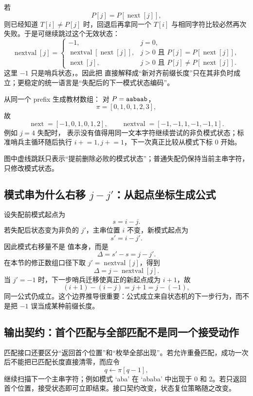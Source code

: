 \documentclass[UTF8,fontset=none,11pt,a4paper]{ctexart}
\begin{document}
若
\[
P[j]=P[\operatorname{next}[j]],
\]
则已经知道 $T[i]\ne P[j]$ 时，回退后再拿同一个 $T[i]$ 与相同字符比较必然再次失败。于是可继续跳过这个无效状态：
\[
\operatorname{nextval}[j]=
\begin{cases}
-1,&j=0,\\
\operatorname{nextval}[\operatorname{next}[j]],&j>0\text{ 且 }P[j]=P[\operatorname{next}[j]],\\
\operatorname{next}[j],&j>0\text{ 且 }P[j]\ne P[\operatorname{next}[j]].
\end{cases}
\]
这里 $-1$ 只是哨兵状态，。因此把  直接解释成“新对齐前缀长度”只在其非负时成立；更稳定的统一语言是“失配后的下一模式状态编码”。

\begin{examplebox}{从同一个 prefix 生成教材数组：}
对 $P=\texttt{aabaab}$，
\[
\pi=[0,1,0,1,2,3],
\]
故
\[
\operatorname{next}=[-1,0,1,0,1,2],
\qquad
\operatorname{nextval}=[-1,-1,1,-1,-1,1].
\]
例如 $j=4$ 失配时， 表示没有值得用同一文本字符继续尝试的非负模式状态；标准哨兵主循环随后执行 $i\mathrel{+}=1,j\mathrel{+}=1$，下一次真正比较从模式下标 0 开始。
\end{examplebox}

\begin{center}
\resizebox{0.94\linewidth}{!}{}
\end{center}
图中虚线跳跃只表示“提前删除必败的模式状态”；普通失配仍保持当前主串字符，只修改模式状态。

\subsection{模式串为什么右移 \texorpdfstring{$j-j'$}{j-j'}：从起点坐标生成公式}
设失配前模式起点为
\[
s=i-j.
\]
若失配后状态变为非负的 $j'$，主串位置 $i$ 不变，新模式起点为
\[
s'=i-j'.
\]
因此模式右移量不是  值本身，而是
\[
\Delta=s'-s=j-j'.
\]
在本节的修正数组口径下取 $j'=\operatorname{nextval}[j]$，得到
\[
\boxed{\Delta=j-\operatorname{nextval}[j]}.
\]
当 $j'=-1$ 时，下一步哨兵迁移使真正的新起点成为 $i+1$，故
\[
(i+1)-(i-j)=j+1=j-(-1),
\]
同一公式仍成立。这个边界推导很重要：公式成立来自状态机的下一步行为，而不是把 $-1$ 误当成某种前缀长度。

\subsection{输出契约：首个匹配与全部匹配不是同一个接受动作}
匹配接口还要区分“返回首个位置”和“枚举全部出现”。若允许重叠匹配，成功一次后不能把已匹配长度直接清零，而应令
\[
q\leftarrow\pi[q-1],
\]
继续扫描下一个主串字符；例如模式 `aba' 在 `ababa' 中出现于 0 和 2。若只返回首个位置，接受状态即可立即结束。接口契约改变，状态复位策略随之改变。
\end{document}
